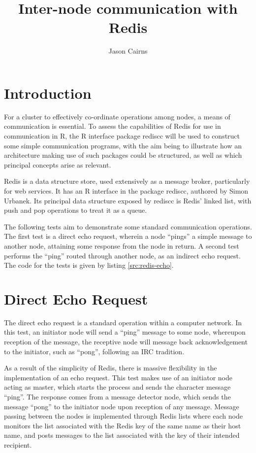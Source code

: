 \documentclass[10pt,a4paper]{article}
\begin{document}
\title{Inter-node communication with Redis}
\author{Jason Cairns}
  
\maketitle{}

\section{Introduction}
For a cluster to effectively co-ordinate operations among nodes, a means of
communication is essential.
To assess the capabilities of Redis for use in communication in R, the R
interface package rediscc will be used to construct some simple communication
programs, with the aim being to illustrate how an architecture making use of
such packages could be structured, as well as which principal concepts arise as
relevant\cite{yu02:_rmpi}\cite{urbanek2020rediscc}.

Redis is a data structure store, used extensively as a message broker,
particularly for web services.
It has an R interface in the package rediscc, authored by Simon Urbanek.
Its principal data structure exposed by rediscc is Redis' linked list, with
push and pop operations to treat it as a queue.

The following tests aim to demonstrate some standard communication operations.
The first test is a direct echo request, wherein a node ``pings'' a simple
message to another node, attaining some response from the node in return.
A second test performs the ``ping'' routed through another node, as an indirect
echo request.
The code for the tests is given by listing \ref{src:redis-echo}.

\section{Direct Echo Request}
The direct echo request is a standard operation within a computer network\cite{rfc1122}.
In this test, an initiator node will send a ``ping'' message to some node,
whereupon reception of the message, the receptive node will message back
acknowledgement to the initiator, such as ``pong'', following an IRC
tradition\cite{rfc1459}.

As a result of the simplicity of Redis, there is massive flexibility in the
implementation of an echo request.
This test makes use of an initiator node acting as master, which starts the
process and sends the character message ``ping''. The response comes from a
message detector node, which sends the message ``pong'' to the initiator node
upon reception of any message.
Message passing between the nodes is implemented through Redis lists where each
node monitors the list associated with the Redis key of the same name as their
host name, and posts messages to the list associated with the key of their
intended recipient.
\end{document}
